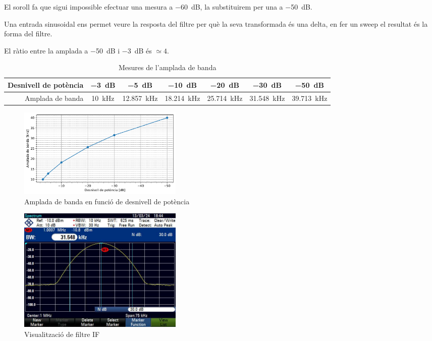\documentclass[catalan, a4paper, nobib]{tufte-handout}
\begin{document}
\newpage


El soroll fa que sigui impossible efectuar una mesura a \qty{-60}{\deci\bel}, la substituirem per una a \qty{-50}{\deci\bel}.

Una entrada sinusoidal ens permet veure la resposta del filtre per què la seva transformada és una delta, en fer un sweep el resultat és la forma del filtre.

El ràtio entre la amplada a \qty{-50}{\deci\bel} i \qty{-3}{\deci\bel} és $\simeq\num{4}$.

\vspace{30px}

\begin{table}[h]
    \begin{center}
      \begin{tabular}{@{}rcccccc@{}}
        \toprule
        Desnivell de potència & \qty{-3}{\deci\bel} & \qty{-5}{\deci\bel} & \qty{-10}{\deci\bel} & \qty{-20}{\deci\bel} & \qty{-30}{\deci\bel} & \qty{-50}{\deci\bel} \\
        \midrule
        Amplada de banda & \qty{10}{\kilo\hertz} & \qty{12.857}{\kilo\hertz} & \qty{18.214}{\kilo\hertz} & \qty{25.714}{\kilo\hertz} & \qty{31.548}{\kilo\hertz} & \qty{39.713}{\kilo\hertz} \\
        \bottomrule
      \end{tabular}
    \end{center}
    \vspace{5px}
    \caption{Mesures de l'amplada de banda}
    \label{tab:t1}
\end{table}

\vspace{30px}

\begin{figure}[h]
    \begin{center}
        \includegraphics[width=300px]{p3_2.pdf}
    \end{center}
    \caption{Amplada de banda en funció de desnivell de potència}
\end{figure}

\begin{figure}[h]
    \begin{center}
        \includegraphics[width=300px]{p3.png}
    \end{center}
    \caption{Visualització de filtre IF}
\end{figure}
\end{document}
